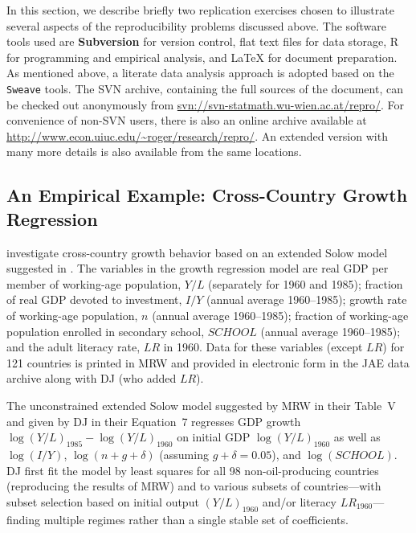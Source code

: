 \documentclass[10pt,a4paper,twoside]{article}
\let\code=\texttt
\let\pkg=\textbf
\let\proglang=\textsf
\begin{document}
In this section, we describe briefly two replication exercises chosen
to illustrate several aspects of the reproducibility problems discussed above.
The software tools used are \pkg{Subversion} for version control, flat text files
for data storage, \proglang{R} \citep{repro:R:2007} for programming and empirical analysis, and {\LaTeX}
for document preparation. As mentioned above, a literate data analysis approach is
adopted based on the \code{Sweave} tools. The SVN archive, containing the
full sources of the document, can be checked out anonymously from
\url{svn://svn-statmath.wu-wien.ac.at/repro/}. For convenience of non-SVN users,
there is also an online archive available at \url{http://www.econ.uiuc.edu/~roger/research/repro/}.
An extended version \citep{repro:Koenker+Zeileis:2007} with many more details is also available
from the same locations.

\subsection{An Empirical Example: Cross-Country Growth Regression} \label{sec:growth}



\citet[henceforth DJ]{repro:Durlauf+Johnson:1995} investigate cross-country
growth behavior based on an extended Solow model suggested in
\citet[henceforth MRW]{repro:Mankiw+Romer+Weil:1992}. The variables in the growth regression
model are real GDP per member of working-age population, $Y/L$
(separately for 1960 and 1985); fraction of real GDP devoted to investment, $I/Y$
(annual average 1960--1985); growth rate of working-age population, $n$ (annual average 1960--1985);
fraction of working-age population enrolled in secondary school, $\mathit{SCHOOL}$
(annual average 1960--1985); and the adult literacy rate, $\mathit{LR}$ in 1960.
Data for these variables (except $\mathit{LR}$) for 121 countries is printed
in MRW and provided in electronic form in the JAE data archive along
with DJ (who added $\mathit{LR}$).

The unconstrained extended Solow model suggested by MRW in their Table~V and given by DJ in their
Equation~7 regresses GDP growth $\log(Y/L)_{1985} - \log(Y/L)_{1960}$ on initial GDP
$\log(Y/L)_{1960}$ as well as $\log(I/Y)$, $\log(n + g + \delta)$ (assuming $g + \delta = 0.05$),
and $\log(\mathit{SCHOOL})$. DJ first fit the model by least squares for all
98 non-oil-producing countries (reproducing the 
results of MRW) and to various subsets of countries---with subset selection based
on initial output $(Y/L)_{1960}$ and/or literacy $\mathit{LR}_{1960}$---finding multiple
regimes rather than a single stable set of coefficients.
\end{document}
